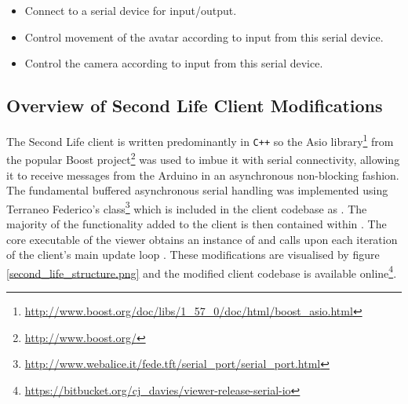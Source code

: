 \begin{itemize}
	\item Connect to a serial device for input/output.
	\item Control movement of the avatar according to input from this serial device.
	\item Control the camera according to input from this serial device.
\end{itemize}


\subsection{Overview of Second Life Client Modifications}

\newcommand{\asioFootnote}{\footnote{\url{http://www.boost.org/doc/libs/1_57_0/doc/html/boost_asio.html}}}

\newcommand{\boostFootnote}{\footnote{\url{http://www.boost.org/}}}

\newcommand{\fedetftFootnote}{\footnote{\url{http://www.webalice.it/fede.tft/serial_port/serial_port.html}}}

\newcommand{\regionmodulelimitationFootnote}{\footnote{This is not due to any limitation on the part of OpenSim, but simply due to the Second Life client modifications being pursued further than the OpenSim region module.}}

\newcommand{\megaregionFootnote}{\footnote{\url{http://opensimulator.org/wiki/Setting_Up_Mega-Regions}}}



The Second Life client is written predominantly in \texttt{C++} so the Asio library\asioFootnote{} from the popular Boost project\boostFootnote{} was used to imbue it with serial connectivity, allowing it to receive messages from the Arduino in an asynchronous non-blocking fashion. The fundamental buffered asynchronous serial handling was implemented using Terraneo Federico's  class\fedetftFootnote{} which is included in the client codebase as . The majority of the functionality added to the client is then contained within . The core executable of the viewer  obtains an instance of  and calls  upon each iteration of the client's main update loop . These modifications are visualised by figure \ref{second_life_structure.png} and the modified client codebase is available online\footnote{\url{https://bitbucket.org/cj_davies/viewer-release-serial-io}}.

